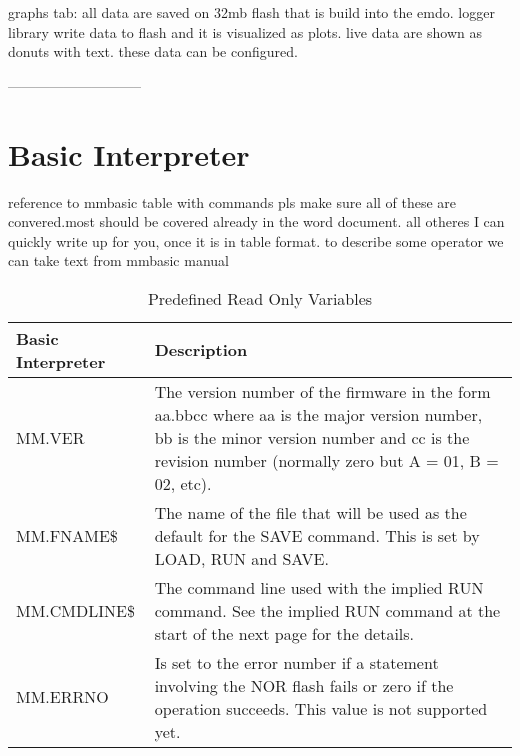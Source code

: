 \documentclass[11pt,fleqn]{book} %
\numberwithin{equation}{section} %
\numberwithin{figure}{section} %
\numberwithin{table}{section} %
\begin{document}
graphs tab: all data are saved on 32mb flash that is build into the emdo. logger library write data to flash and it is visualized as plots. live data are shown as donuts with text. these data can be configured.

-----------------------------

\chapter{Basic Interpreter}

reference to mmbasic
table with commands
pls make sure all of these are convered.most should be covered already in the word document. all otheres I can quickly write up for you, once it is in table format. to describe some operator we can take text from mmbasic manual

\begin{table}[]
\centering
\caption{Predefined Read Only Variables}
\label{Predefined_Read_Only_Variables}
\begin{tabular}{|p{4cm}|p{10cm}|}
\hline
\textbf{Basic Interpreter} & \textbf{Description}                                                             \\ \hline
MM.VER & The version number of the firmware in the form aa.bbcc where aa is the major version number, bb is the minor version number and cc is the revision number (normally zero but A = 01, B = 02, etc).
\\ \hline
MM.FNAME\$ & The name of the file that will be used as the default for the SAVE command. This is set by LOAD, RUN and SAVE.
\\ \hline
MM.CMDLINE\$ & The command line used with the implied RUN command. See the implied RUN command at the start of the next page for the details.
\\ \hline
MM.ERRNO & Is set to the error number if a statement involving the NOR flash fails or
zero if the operation succeeds. This value is not supported yet.
\\ \hline
\end{tabular}
\end{table}
\end{document}

